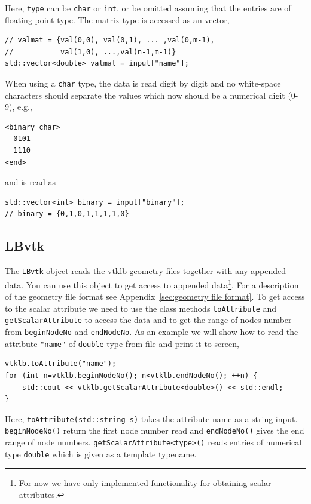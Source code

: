 \documentclass[11pt,a4paper]{report}
\begin{document}
Here, \texttt{type} can be \texttt{char} or \texttt{int}, or be omitted assuming that the entries are of floating point type. The matrix type is accessed as an vector, 
\begin{verbatim}
// valmat = {val(0,0), val(0,1), ... ,val(0,m-1), 
//           val(1,0), ...,val(n-1,m-1)}
std::vector<double> valmat = input["name"];
\end{verbatim}
When using a \texttt{char} type, the data is read digit by digit and no white-space characters should separate the values which now should be a numerical digit (0-9), e.g.,
\begin{verbatim}
<binary char>   
  0101
  1110
<end>
\end{verbatim}
and is read as
\begin{verbatim}
std::vector<int> binary = input["binary"]; 
// binary = {0,1,0,1,1,1,1,0} 
\end{verbatim}   

\subsection{LBvtk}\label{sec:lbvtk}

The \texttt{LBvtk} object reads the vtklb geometry files together with any appended data. You can use this object to get access to appended data\footnote{For now we have only implemented functionality for obtaining scalar attributes.}. For a description of the geometry file format see Appendix~\ref{sec:geometry file format}. To get access to the scalar attribute we need to use the class methods \texttt{toAttribute} and \texttt{getScalarAttribute} to access the data and to get the range of nodes number from \texttt{beginNodeNo} and \texttt{endNodeNo}. As an example we will show how to read the attribute \texttt{"name"} of \texttt{double}-type from file and print it to screen,
\begin{verbatim}
vtklb.toAttribute("name");
for (int n=vtklb.beginNodeNo(); n<vtklb.endNodeNo(); ++n) {
    std::cout << vtklb.getScalarAttribute<double>() << std::endl;
}
\end{verbatim}
Here, \texttt{toAttribute(std::string s)} takes the attribute name as a string input. \texttt{beginNodeNo()} return the first node number read and \texttt{endNodeNo()} gives the end range of node numbers. \texttt{getScalarAttribute<type>()} reads entries of numerical type \texttt{double} which is given as a template typename.
\end{document}
